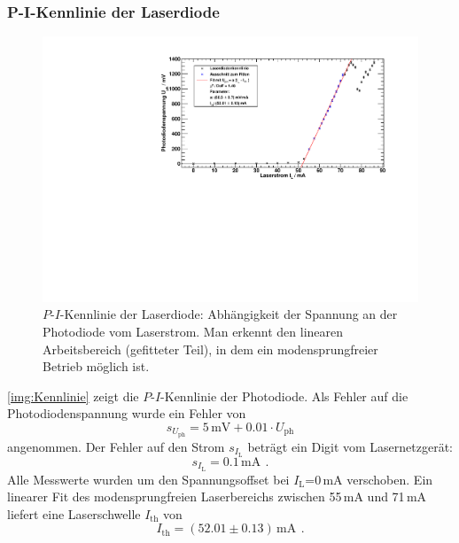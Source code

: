 \subsubsection*{P-I-Kennlinie der Laserdiode}
\begin{figure}[H]
    \begin{center}
        \includegraphics[width=\textwidth]{../img/part1/diodenkennlinie.pdf}
        \caption{$P$-$I$-Kennlinie der Laserdiode: Abhängigkeit der Spannung
        an der Photodiode vom Laserstrom. Man erkennt den linearen Arbeitsbereich (gefitteter Teil),
        in dem ein modensprungfreier Betrieb möglich ist.}
        \label{img:Kennlinie}
    \end{center}
\end{figure}
\autoref{img:Kennlinie} zeigt die $P$-$I$-Kennlinie der Photodiode.
Als Fehler auf die Photodiodenspannung wurde ein Fehler von
\begin{equation}
    s_{U_{\text{ph}}}= 5\,\text{mV} + 0.01 \cdot U_{\text{ph}}
\end{equation}
angenommen.
Der Fehler auf den Strom $s_{I_{\text{L}}}$ beträgt ein Digit vom Lasernetzgerät:
\begin{equation}
    s_{I_{\text{L}}} = 0.1\,\text{mA} \ \, .
\end{equation}
Alle Messwerte wurden um den Spannungsoffset bei $I_{\text{L}}$=0\,mA verschoben.
Ein linearer Fit des modensprungfreien Laserbereichs zwischen 55\,mA und 71\,mA
liefert eine Laserschwelle $I_{\text{th}}$ von
\begin{equation}
    I_{\text{th}}=(52.01 \pm 0.13)\,\text{mA} \ \, .
\end{equation}